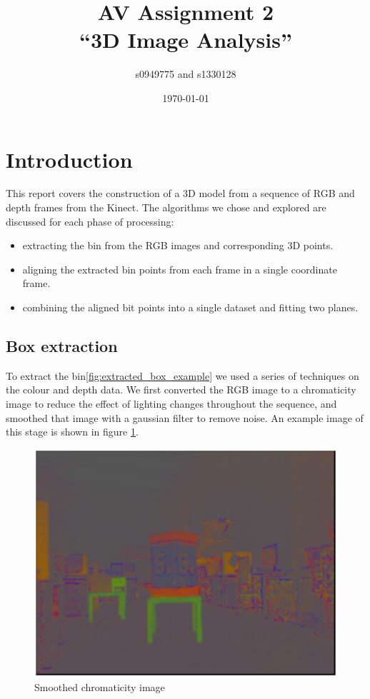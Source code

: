 \documentclass{article}
\begin{document}
\title{AV Assignment 2\\``3D Image Analysis''}
\author{s0949775 and s1330128}
\date{\today}
\maketitle


\section{Introduction}
This report covers the construction of a 3D model from a 
sequence of RGB and depth frames from the Kinect. 
The algorithms we chose and explored are discussed for
each phase of processing:
\begin{itemize}
\item extracting the bin from the RGB images and corresponding 3D points.
\item aligning the extracted bin points from each frame in a single coordinate frame.
\item combining the aligned bit points into a single dataset and fitting two planes.
\end{itemize}

\subsection{Box extraction}
To extract the bin\ref{fig:extracted_box_example} we used a series of techniques on the colour and depth data.  We first converted the RGB image to a chromaticity image to reduce the effect of lighting changes throughout the sequence, and smoothed that image with a gaussian filter to remove noise.  An example image of this stage is shown in figure \ref{full_chromaticity_image}.  

\begin{figure}[h!]
  \centering
  \includegraphics[width=1.0\textwidth]{figs/full_chromaticity_image}
  \caption{Smoothed chromaticity image}
  \label{full_chromaticity_image}
\end{figure}
\end{document}
